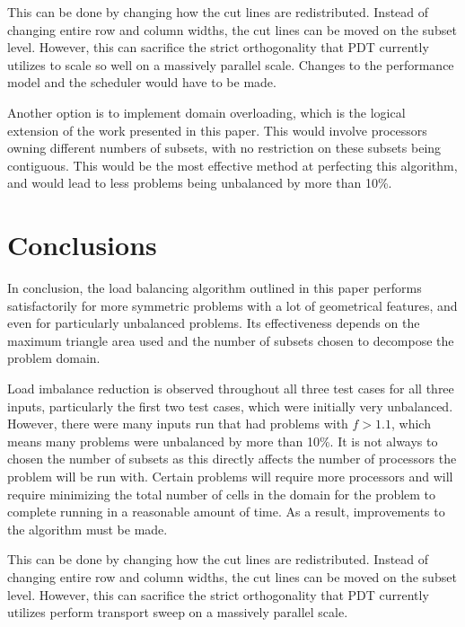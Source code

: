 \documentclass{anstrans}
\begin{document}
This can be done by changing how the cut lines are redistributed. Instead of changing entire row and column widths, the cut lines can be moved on the subset level. However, this can sacrifice the strict orthogonality that PDT currently utilizes to scale so well on a massively parallel scale. Changes to the performance model and the scheduler would have to be made.

Another option is to implement domain overloading, which is the logical extension of the work presented in this paper. This would involve processors owning different numbers of subsets, with no restriction on these subsets being contiguous. This would be the most effective method at perfecting this algorithm, and would lead to less problems being unbalanced by more than 10\%.

\section{Conclusions}

In conclusion, the load balancing algorithm outlined in this paper performs satisfactorily for more symmetric problems with a lot of geometrical features, and even for particularly unbalanced problems. Its effectiveness depends on the maximum triangle area used and the number of subsets chosen to decompose the problem domain. 

Load imbalance reduction is observed throughout all three test cases for all three inputs, particularly the first two test cases, which were initially very unbalanced. However, there were many inputs run that had problems with $f > 1.1$, which means many problems were unbalanced by more than 10\%. It is not always to chosen the number of subsets as this directly affects the number of processors the problem will be run with. Certain problems will require more processors and will require minimizing the total number of cells in the domain for the problem to complete running in a reasonable amount of time. As a result, improvements to the algorithm must be made. 

This can be done by changing how the cut lines are redistributed. Instead of changing entire row and column widths, the cut lines can be moved on the subset level. However, this can sacrifice the strict orthogonality that PDT currently utilizes perform transport sweep on a massively parallel scale. 
\end{document}
